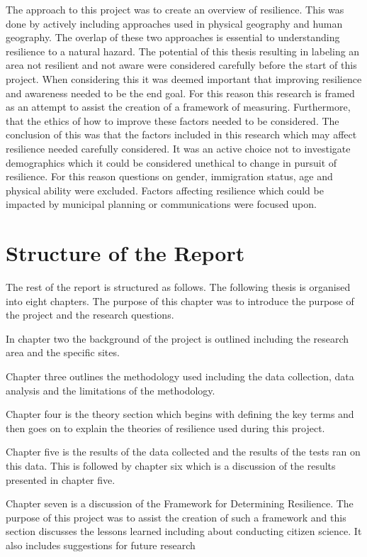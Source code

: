 The approach to this project was to create an overview of resilience. This was done by actively including approaches used in physical geography and human geography. The overlap of these two approaches is essential to understanding resilience to a natural hazard. The potential of this thesis resulting in labeling an area not resilient and not aware were considered carefully before the start of this project. When considering this it was deemed important that improving resilience and awareness needed to be the end goal. For this reason this research is framed as an attempt to assist the creation of a framework of measuring. Furthermore, that the ethics of how to improve these factors needed to be considered. The conclusion of this was that the factors included in this research which may affect resilience needed carefully considered. It was an active choice not to investigate demographics which it could be considered unethical to change in pursuit of resilience. For this reason questions on gender, immigration status, age and physical ability were excluded. Factors affecting resilience which could be impacted by municipal planning or communications were focused upon. 


\section{Structure of the Report}
The rest of the report is structured as follows. 
The following thesis is organised into eight chapters. The purpose of this chapter was to introduce the purpose of the project and the research questions.

In chapter two the background of the project is outlined including the research area and the specific sites. 

Chapter three outlines the methodology used including the data collection, data analysis and the limitations of the methodology.

Chapter four is the theory section which begins with defining the key terms and then goes on to explain the theories of resilience used during this project.

Chapter five is the results of the data collected and the results of the tests ran on this data. This is followed by chapter six which is a discussion of the results presented in chapter five. 


Chapter seven is a discussion of the Framework for Determining Resilience. The purpose of this project was to assist the creation of such a framework and this section discusses the lessons learned including about conducting citizen science. It also includes suggestions for future research

